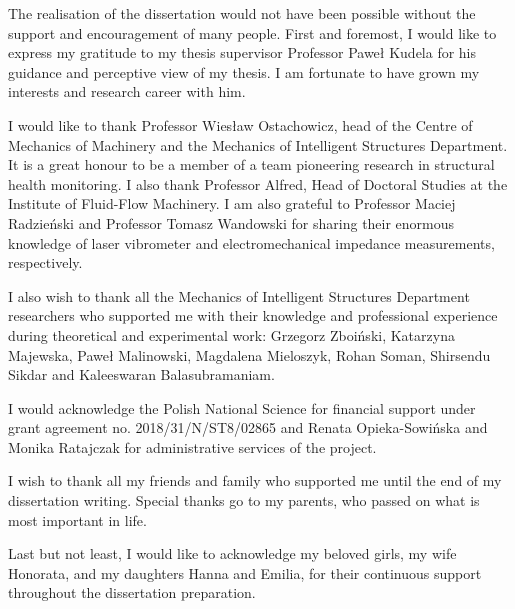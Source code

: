 \beforepreface
The realisation of the dissertation would not have been possible without the support and encouragement of many people.
First and foremost, I would like to express my gratitude to my thesis supervisor Professor Paweł Kudela for his guidance and perceptive view of my thesis.
I am fortunate to have grown my interests and research career with him.

I would like to thank Professor Wiesław Ostachowicz, head of the Centre of Mechanics of Machinery and the Mechanics of Intelligent Structures Department.
It is a great honour to be a member of a team pioneering research in structural health monitoring.
I also thank Professor Alfred, Head of Doctoral Studies at the Institute of Fluid-Flow Machinery.
I am also grateful to Professor Maciej Radzieński and Professor Tomasz Wandowski for sharing their enormous knowledge of laser vibrometer and electromechanical impedance measurements, respectively.

I also wish to thank all the Mechanics of Intelligent Structures Department researchers who supported me with their knowledge and professional experience during theoretical and experimental work: Grzegorz Zboiński, Katarzyna Majewska, Paweł Malinowski, Magdalena Mieloszyk, Rohan Soman, Shirsendu Sikdar and Kaleeswaran Balasubramaniam.

I would acknowledge the Polish National Science for financial support under grant agreement no. 2018/31/N/ST8/02865 and Renata Opieka-Sowińska and Monika Ratajczak for administrative services of the project.

I wish to thank all my friends and family who supported me until the end of my dissertation writing.
Special thanks go to my parents, who passed on what is most important in life.

Last but not least, I would like to acknowledge my beloved girls, my wife Honorata, and my daughters Hanna and Emilia, for their continuous support throughout the dissertation preparation.
\afterpreface